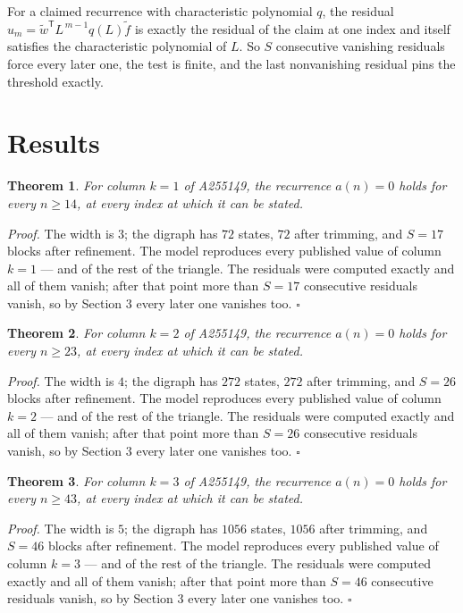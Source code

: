 \documentclass[11pt]{article}
\newtheorem{theorem}{Theorem}
\theoremstyle{definition}
\begin{document}
For a claimed recurrence with characteristic polynomial $q$, the residual $u_m = \tilde w^{\mathsf T}L^{\,m-1}q(L)\tilde f$ is exactly the residual of the claim at one index and itself satisfies the characteristic polynomial of $L$. So $S$ consecutive vanishing residuals force every later one, the test is finite, and the last nonvanishing residual pins the threshold exactly.

\section{Results}

\begin{theorem} For column $k = 1$ of A255149, the recurrence $a(n) = 0$ holds for every $n \ge 14$, at every index at which it can be stated.\end{theorem}

{\itshape Proof.} The width is $3$; the digraph has $72$ states, $72$ after trimming, and $S = 17$ blocks after refinement. The model reproduces every published value of column $k = 1$ --- and of the rest of the triangle. The residuals were computed exactly and all of them vanish; after that point more than $S = 17$ consecutive residuals vanish, so by Section 3 every later one vanishes too. $\square$

\begin{theorem} For column $k = 2$ of A255149, the recurrence $a(n) = 0$ holds for every $n \ge 23$, at every index at which it can be stated.\end{theorem}

{\itshape Proof.} The width is $4$; the digraph has $272$ states, $272$ after trimming, and $S = 26$ blocks after refinement. The model reproduces every published value of column $k = 2$ --- and of the rest of the triangle. The residuals were computed exactly and all of them vanish; after that point more than $S = 26$ consecutive residuals vanish, so by Section 3 every later one vanishes too. $\square$

\begin{theorem} For column $k = 3$ of A255149, the recurrence $a(n) = 0$ holds for every $n \ge 43$, at every index at which it can be stated.\end{theorem}

{\itshape Proof.} The width is $5$; the digraph has $1056$ states, $1056$ after trimming, and $S = 46$ blocks after refinement. The model reproduces every published value of column $k = 3$ --- and of the rest of the triangle. The residuals were computed exactly and all of them vanish; after that point more than $S = 46$ consecutive residuals vanish, so by Section 3 every later one vanishes too. $\square$
\end{document}
